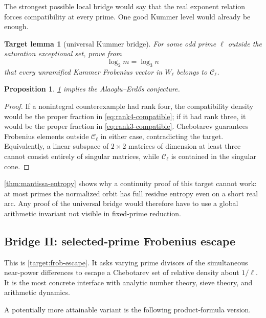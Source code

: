 \documentclass[11pt,oneside]{article}
\newtheorem{proposition}[theorem]{Proposition}
\newtheorem{target}[theorem]{Target lemma}
\theoremstyle{definition}
\theoremstyle{remark}
\begin{document}
The strongest possible local bridge would say that the real exponent relation
forces compatibility at every prime.  One good Kummer level would already be
enough.

\begin{target}[universal Kummer bridge]\label{target:universal-kummer}
For some odd prime $\ell$ outside the saturation exceptional set, prove from
\[
 \log_2 m=\log_3 n
\]
that every unramified Kummer Frobenius vector in $W_\ell$ belongs to
$\mathcal C_\ell$.
\end{target}

\begin{proposition}\label{prop:universal-finishes}
\cref{target:universal-kummer} implies the Alaoglu--Erd\H{o}s conjecture.
\end{proposition}

\begin{proof}
If a nonintegral counterexample had rank four, the compatibility density
would be the proper fraction in \eqref{eq:rank4-compatible}; if it had rank
three, it would be the proper fraction in \eqref{eq:rank3-compatible}.
Chebotarev guarantees Frobenius elements outside $\mathcal C_\ell$ in either
case, contradicting the target.  Equivalently, a linear subspace of
$2\times2$ matrices of dimension at least three cannot consist entirely of
singular matrices, while $\mathcal C_\ell$ is contained in the singular
cone.
\end{proof}

\cref{thm:mantissa-entropy} shows why a continuity proof of this target cannot
work: at most primes the normalized orbit has full residue entropy even on a
short real arc.  Any proof of the universal bridge would therefore have to
use a global arithmetic invariant not visible in fixed-prime reduction.

\subsection{Bridge II: selected-prime Frobenius escape}

This is \cref{target:frob-escape}.  It asks varying prime divisors of the
simultaneous near-power differences to escape a Chebotarev set of relative
density about $1/\ell$.  It is the most concrete interface with analytic
number theory, sieve theory, and arithmetic dynamics.

A potentially more attainable variant is the following product-formula
version.
\end{document}
